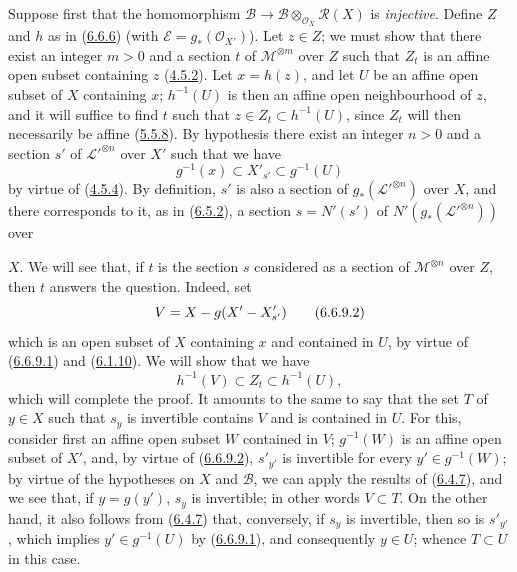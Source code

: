 Suppose first that the homomorphism
$\mathcal{B}\to
\mathcal{B}\otimes_{\mathcal{O}_X}\mathcal{R}(X)$ is \emph{injective}.
Define $Z$ and $h$ as in (\hyperref[II.6.6.6]{6.6.6}) (with
$\mathcal{E}=g_*(\mathcal{O}_{X'})$). Let $z\in Z$; we must show that there
exist an integer $m>0$ and a section $t$ of $\mathcal{M}^{\otimes m}$
over $Z$ such that $Z_t$ is an affine open subset containing $z$
(\hyperref[II.4.5.2]{4.5.2}). Let $x=h(z)$, and let $U$ be an affine open
subset of $X$ containing $x$; $h^{-1}(U)$ is then an affine open
neighbourhood of $z$, and it will suffice to find $t$ such that
$z\in Z_t\subset h^{-1}(U)$, since $Z_t$ will then necessarily be affine
(\hyperref[II.5.5.8]{5.5.8}). By hypothesis there exist an integer $n>0$
and a section $s'$ of ${\mathcal{L}'}^{\otimes n}$ over $X'$ such that
we have
\[
\label{II.6.6.9.1}
g^{-1}(x)\subset X'_{s'}\subset g^{-1}(U)
\tag{6.6.9.1}
\]
by virtue of (\hyperref[II.4.5.4]{4.5.4}). By definition, $s'$ is also a
section of $g_*({\mathcal{L}'}^{\otimes n})$ over $X$, and there
corresponds to it, as in (\hyperref[II.6.5.2]{6.5.2}), a section
$s=N'(s')$ of $N'(g_*({\mathcal{L}'}^{\otimes n}))$ over


$X$. We will see that, if $t$ is the section $s$ considered as a section
of $\mathcal{M}^{\otimes n}$ over $Z$, then $t$ answers the question.
Indeed, set
\[
\label{II.6.6.9.2}
V=X- g(X'- X'_{s'})
\tag{6.6.9.2}
\]
which is an open subset of $X$ containing $x$ and contained in $U$, by
virtue of (\hyperref[II.6.6.9.1]{6.6.9.1}) and
(\hyperref[II.6.1.10]{6.1.10}). We will show that we have
\[
\label{II.6.6.9.3}
h^{-1}(V)\subset Z_t\subset h^{-1}(U),
\tag{6.6.9.3}
\]
which will complete the proof. It amounts to the same to say that the set
$T$ of $y\in X$ such that $s_y$ is invertible contains $V$ and is contained
in $U$. For this, consider first an affine open subset $W$ contained in
$V$; $g^{-1}(W)$ is an affine open subset of $X'$, and, by virtue of
(\hyperref[II.6.6.9.2]{6.6.9.2}), $s'_{y'}$ is invertible for every
$y'\in g^{-1}(W)$; by virtue of the hypotheses on $X$ and $\mathcal{B}$, we
can apply the results of (\hyperref[II.6.4.7]{6.4.7}), and we see that,
if $y=g(y')$, $s_y$ is invertible; in other words $V\subset T$. On the other
hand, it also follows from (\hyperref[II.6.4.7]{6.4.7}) that, conversely,
if $s_y$ is invertible, then so is $s'_{y'}$, which implies
$y'\in g^{-1}(U)$ by (\hyperref[II.6.6.9.1]{6.6.9.1}), and consequently
$y\in U$; whence $T\subset U$ in this case.

